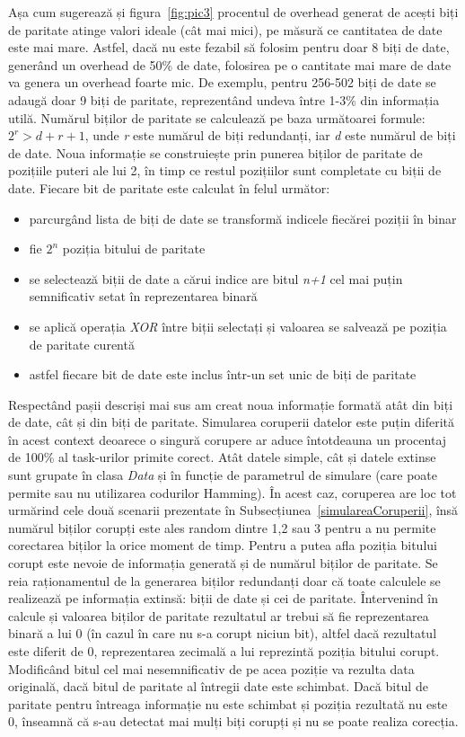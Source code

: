 \documentclass[12pt,a4paper]{report}
\begin{document}
Așa cum sugerează și figura~\ref{fig:pic3} procentul de overhead generat de acești biți de paritate atinge valori ideale (cât mai mici), pe măsură ce cantitatea de date este mai mare. Astfel, dacă nu este fezabil să folosim pentru doar 8 biți de date, generând un overhead de 50\% de date, folosirea pe o cantitate mai mare de date va genera un overhead foarte mic. De exemplu, pentru 256-502 biți de date se adaugă doar 9 biți de paritate, reprezentând undeva între 1-3\% din informația utilă. Numărul biților de paritate se calculează pe baza următoarei formule: $2^r > d + r + 1$, unde \textit{r} este numărul de biți redundanți, iar \textit{d} este numărul de biți de date. Noua informație se construiește prin punerea biților de paritate de pozițiile puteri ale lui 2, în timp ce restul pozițiilor sunt completate cu biții de date. Fiecare bit de paritate este calculat în felul următor:
\begin{itemize}
	\item parcurgând lista de biți de date se transformă indicele fiecărei poziții în binar
	\item fie $2^n$ poziția bitului de paritate
	\item se selectează biții de date a cărui indice are bitul \textit{n+1} cel mai puțin semnificativ setat în reprezentarea binară
	\item se aplică operația \textit{XOR} între biții selectați și valoarea se salvează pe poziția de paritate curentă
	\item astfel fiecare bit de date este inclus într-un set unic de biți de paritate
\end{itemize}

Respectând pașii descriși mai sus am creat noua informație formată atât din biți de date, cât și din biți de paritate. Simularea coruperii datelor este puțin diferită în acest context deoarece o singură corupere ar aduce întotdeauna un procentaj de 100\% al task-urilor primite corect. Atât datele simple, cât și datele extinse sunt grupate în clasa \textit{Data} și în funcție de parametrul de simulare (care poate permite sau nu utilizarea codurilor Hamming). În acest caz, coruperea are loc tot urmărind cele două scenarii prezentate în Subsecțiunea~\ref{simulareaCoruperii}, însă numărul biților corupți este ales random dintre 1,2 sau 3 pentru a nu permite corectarea biților la orice moment de timp. Pentru a putea afla poziția bitului corupt este nevoie de informația generată și de numărul biților de paritate. Se reia raționamentul de la generarea biților redundanți doar că toate calculele se realizează pe informația extinsă: biții de date și cei de paritate. Întervenind în calcule și valoarea biților de paritate rezultatul ar trebui să fie reprezentarea binară a lui 0 (în cazul în care nu s-a corupt niciun bit), altfel dacă rezultatul este diferit de 0, reprezentarea zecimală a lui reprezintă poziția bitului corupt. Modificând bitul cel mai nesemnificativ de pe acea poziție va rezulta data originală, dacă bitul de paritate al întregii date este schimbat. Dacă bitul de paritate pentru întreaga informație nu este schimbat și poziția rezultată nu este 0, înseamnă că s-au detectat mai mulți biți corupți și nu se poate realiza corecția.
\end{document}
